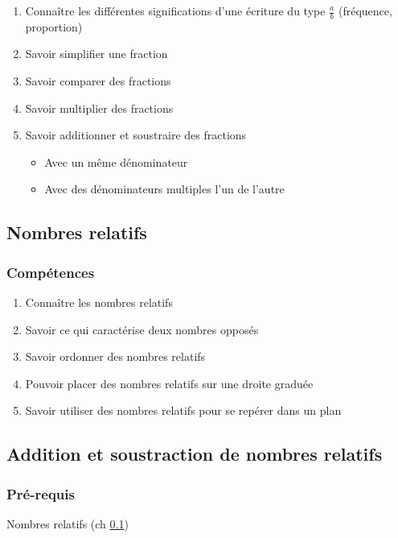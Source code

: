 \begin{enumerate}

	\item Connaître les différentes significations d'une écriture du type  {\Large $\frac{a}{b}$} (fréquence, proportion)
	\item Savoir simplifier une fraction
	\item Savoir comparer des fractions
	\item Savoir multiplier des fractions
	\item Savoir additionner et soustraire des fractions
		\begin{itemize}
			\item Avec un même dénominateur
			\item Avec des dénominateurs multiples l'un de l'autre
		\end{itemize}

\end{enumerate}

\subsection{Nombres relatifs}\label{ch_5_rels}

\subsubsection*{Compétences}
\begin{enumerate}
	\item Connaître les nombres relatifs
	\item Savoir ce qui caractérise deux nombres opposés
	\item Savoir ordonner des nombres relatifs
	\item Pouvoir placer des nombres relatifs sur une droite graduée
	\item Savoir utiliser des nombres relatifs pour se repérer dans un plan
\end{enumerate}

\subsection{Addition et soustraction de nombres relatifs}\label{ch_5_add_rels}

\subsubsection*{Pré-requis}
 Nombres relatifs (ch \ref{ch_5_rels})
 
